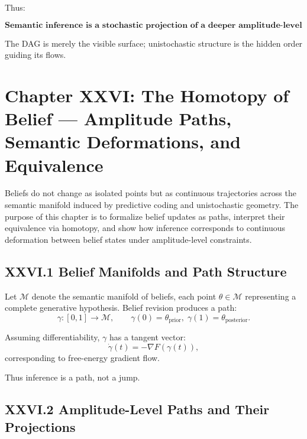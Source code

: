 \documentclass[11pt,letterpaper]{article}
\begin{document}
Thus:

\[
\boxed{
\textbf{Semantic inference is a stochastic projection of a deeper amplitude-level geometry.}
}
\]

The DAG is merely the visible surface;  
unistochastic structure is the hidden order guiding its flows.

\newpage

\section{Chapter XXVI: The Homotopy of Belief —  
Amplitude Paths, Semantic Deformations, and Equivalence}

Beliefs do not change as isolated points but as continuous trajectories across the semantic manifold induced by predictive coding and unistochastic geometry. The purpose of this chapter is to formalize belief updates as paths, interpret their equivalence via homotopy, and show how inference corresponds to continuous deformation between belief states under amplitude-level constraints.

\subsection{XXVI.1 Belief Manifolds and Path Structure}

Let $\mathcal{M}$ denote the semantic manifold of beliefs, each point $\theta \in \mathcal{M}$ representing a complete generative hypothesis. Belief revision produces a path:
\[
\gamma : [0,1] \to \mathcal{M}, \qquad \gamma(0)=\theta_{\text{prior}}, \; \gamma(1)=\theta_{\text{posterior}}.
\]

Assuming differentiability, $\gamma$ has a tangent vector:
\[
\dot{\gamma}(t) = -\nabla F(\gamma(t)),
\]
corresponding to free-energy gradient flow.

Thus inference is a path, not a jump.

\subsection{XXVI.2 Amplitude-Level Paths and Their Projections}
\end{document}
